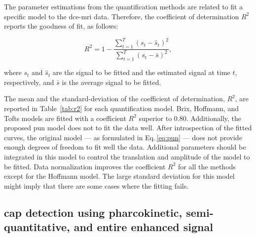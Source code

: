 The parameter estimations from the quantification methods are related to fit a specific model to the \ac{dce}-\ac{mri} data.
Therefore, the coefficient of determination $R^2$ reports the goodness
of fit, as follows:

\begin{equation}
  R^2 = 1 - \frac{\sum_{t = 1}^{T} (s_t - \hat{s}_t)^2}{\sum_{t = 1}^{T} (s_t - \bar{s})^2} ,
  \label{eq:r2}
\end{equation}

\noindent where $s_t$ and $\hat{s}_t$ are the signal to be fitted and
the estimated signal at time $t$, respectively, and $\bar{s}$ is the average signal to be fitted.

The mean and the standard-deviation of the coefficient of determination, $R^{2}$, are reported in Table~\ref{tab:r2} for each quantification model.
Brix, Hoffmann, and Tofts models are fitted with a coefficient $R^{2}$ superior to 0.80.
Additionally, the proposed \ac{pun} model does not to fit the data well.
After introspection of the fitted curves, the original model --- as
formulated in Eq.\,\eqref{eq:pun} --- does not provide enough degrees
of freedom to fit well the data. Additional parameters should be
integrated in this model to control the translation and amplitude of
the model to be fitted.
Data normalization improves the coefficient $R^2$ for all the methods
except for the Hoffmann model.
The large standard deviation for this model might imply that there are some cases where the fitting fails.


\subsection{\acs*{cap} detection using pharcokinetic,
  semi-quantitative, and entire enhanced signal}

